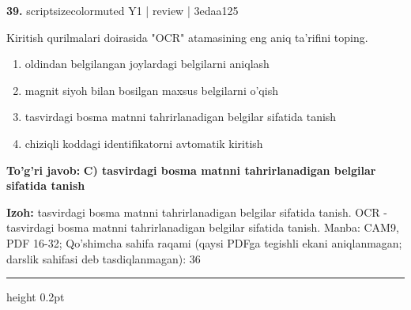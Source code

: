 \documentclass[10pt,a4paper]{article}
\begin{document}
{\bfseries\sffamily\color{ink} 39.} {scriptsizecolor{muted} Y1 | review | 3edaa125}
\par
Kiritish qurilmalari doirasida "OCR" atamasining eng aniq ta'rifini toping.
\begin{enumerate}[label=\Alph*),leftmargin=9mm]
\item oldindan belgilangan joylardagi belgilarni aniqlash
\item magnit siyoh bilan bosilgan maxsus belgilarni o'qish
\item tasvirdagi bosma matnni tahrirlanadigan belgilar sifatida tanish
\item chiziqli koddagi identifikatorni avtomatik kiritish
\end{enumerate}
\begin{tcolorbox}[enhanced,breakable,colback=teal!4,colframe=teal!60!black,boxrule=0.45pt,arc=1.2mm,left=2.7mm,right=2.7mm,top=1.8mm,bottom=1.8mm,before skip=2mm,after skip=2mm]
{\bfseries\sffamily\color{teal}To'g'ri javob:} \textbf{C) tasvirdagi bosma matnni tahrirlanadigan belgilar sifatida tanish}
\par\smallskip
{\bfseries Izoh:} tasvirdagi bosma matnni tahrirlanadigan belgilar sifatida tanish. OCR - tasvirdagi bosma matnni tahrirlanadigan belgilar sifatida tanish. Manba: CAM9, PDF 16-32; Qo'shimcha sahifa raqami (qaysi PDFga tegishli ekani aniqlanmagan; darslik sahifasi deb tasdiqlanmagan): 36
\end{tcolorbox}
\vspace{2mm}\hrule height 0.2pt\vspace{3mm}
\end{document}
